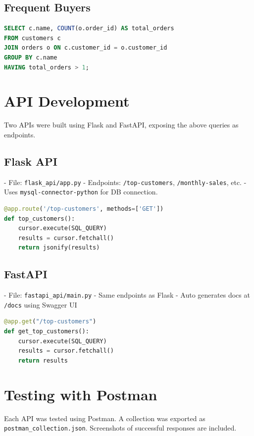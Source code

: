 \documentclass[12pt]{article}
\begin{document}
\subsection{Frequent Buyers}
\begin{lstlisting}[language=SQL]
SELECT c.name, COUNT(o.order_id) AS total_orders
FROM customers c
JOIN orders o ON c.customer_id = o.customer_id
GROUP BY c.name
HAVING total_orders > 1;
\end{lstlisting}

\section{API Development}
Two APIs were built using Flask and FastAPI, exposing the above queries as endpoints.

\subsection{Flask API}
- File: \texttt{flask\_api/app.py}
- Endpoints: \texttt{/top-customers}, \texttt{/monthly-sales}, etc.
- Uses \texttt{mysql-connector-python} for DB connection.

\begin{lstlisting}[language=Python, caption=Flask API Sample Code]
@app.route('/top-customers', methods=['GET'])
def top_customers():
    cursor.execute(SQL_QUERY)
    results = cursor.fetchall()
    return jsonify(results)
\end{lstlisting}

\subsection{FastAPI}
- File: \texttt{fastapi\_api/main.py}
- Same endpoints as Flask
- Auto generates docs at \texttt{/docs} using Swagger UI

\begin{lstlisting}[language=Python, caption=FastAPI Sample Code]
@app.get("/top-customers")
def get_top_customers():
    cursor.execute(SQL_QUERY)
    results = cursor.fetchall()
    return results
\end{lstlisting}

\section{Testing with Postman}
Each API was tested using Postman. A collection was exported as \texttt{postman\_collection.json}. Screenshots of successful responses are included.
\end{document}
